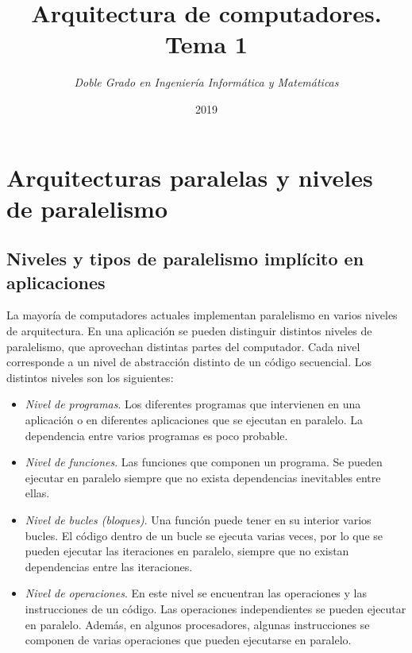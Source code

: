\documentclass[11pt,twoside,titlepage,a4paper]{article}
\begin{document}
\title{\Huge{\textbf{Arquitectura de computadores. Tema 1}}}
\author{\textit{Doble Grado en Ingeniería Informática y Matemáticas}}
\date{2019}
\maketitle

\tableofcontents
\clearpage

\section{Arquitecturas paralelas y niveles de paralelismo}

\subsection{Niveles y tipos de paralelismo implícito en aplicaciones}
La mayoría de computadores actuales implementan paralelismo en varios niveles de arquitectura. En una
aplicación se pueden distinguir distintos niveles de paralelismo, que aprovechan distintas partes del
computador. Cada nivel corresponde a un nivel de abstracción distinto de un código secuencial. Los distintos
niveles son los siguientes:
\begin{itemize}[noitemsep]
	\item \textit{Nivel de programas}. Los diferentes programas que intervienen en una aplicación o en 
	diferentes aplicaciones que se ejecutan en paralelo. La dependencia entre varios programas es poco  
	probable.
	\item \textit{Nivel de funciones}. Las funciones que componen un programa. Se pueden ejecutar en
	paralelo siempre que no exista dependencias inevitables entre ellas.
	\item \textit{Nivel de bucles (bloques)}. Una función puede tener en su interior varios bucles. El
	código dentro de un bucle se ejecuta varias veces, por lo que se pueden ejecutar las iteraciones en 
	paralelo, siempre que no existan dependencias entre las iteraciones.
	\item \textit{Nivel de operaciones}. En este nivel se encuentran las operaciones y las instrucciones de
	un código. Las operaciones independientes se pueden ejecutar en paralelo. Además, en algunos 
	procesadores, algunas instrucciones se componen de varias operaciones que pueden ejecutarse en paralelo.
\end{itemize}
\end{document}
